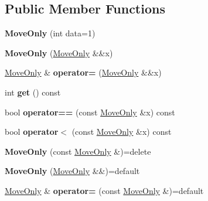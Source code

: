 \subsection*{Public Member Functions}
\begin{DoxyCompactItemize}
\item 
\mbox{\label{class_move_only_a69d1cd6d912aabbe79a6c4893377c2c2}} 
{\bfseries Move\+Only} (int data=1)
\item 
\mbox{\label{class_move_only_a9921c8bdd2b01092e737f58990171378}} 
{\bfseries Move\+Only} (\mbox{\hyperlink{class_move_only}{Move\+Only}} \&\&x)
\item 
\mbox{\label{class_move_only_a4ce78865bdbccfcb8c8fa2593b808a98}} 
\mbox{\hyperlink{class_move_only}{Move\+Only}} \& {\bfseries operator=} (\mbox{\hyperlink{class_move_only}{Move\+Only}} \&\&x)
\item 
\mbox{\label{class_move_only_acf568eaa224c3b2de93da4c60cd4aacd}} 
int {\bfseries get} () const
\item 
\mbox{\label{class_move_only_acb71edea18ce57198e51625bd5985e08}} 
bool {\bfseries operator==} (const \mbox{\hyperlink{class_move_only}{Move\+Only}} \&x) const
\item 
\mbox{\label{class_move_only_a25b82e95414dc0a6a18e2d6400d4500f}} 
bool {\bfseries operator$<$} (const \mbox{\hyperlink{class_move_only}{Move\+Only}} \&x) const
\item 
\mbox{\label{class_move_only_af0827ac99621d97d09845d7d20d8335d}} 
{\bfseries Move\+Only} (const \mbox{\hyperlink{class_move_only}{Move\+Only}} \&)=delete
\item 
\mbox{\label{class_move_only_a40d528ed5eaad59678a8c69900433215}} 
{\bfseries Move\+Only} (\mbox{\hyperlink{class_move_only}{Move\+Only}} \&\&)=default
\item 
\mbox{\label{class_move_only_a147b02258f80ecc96ac25fed61c7cd4a}} 
\mbox{\hyperlink{class_move_only}{Move\+Only}} \& {\bfseries operator=} (const \mbox{\hyperlink{class_move_only}{Move\+Only}} \&)=default

\end{DoxyCompactItemize}
